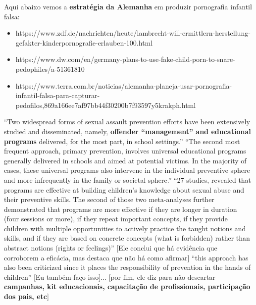 Aqui abaixo vemos a \textbf{estratégia da Alemanha} em produzir pornografia infantil falsa:
\begin{itemize}
  \item https://www.zdf.de/nachrichten/heute/lambrecht-will-ermittlern-herstellung-gefakter-kinderpornografie-erlauben-100.html

  \item https://www.dw.com/en/germany-plans-to-use-fake-child-porn-to-snare-pedophiles/a-51361810

  \item https://www.terra.com.br/noticias/alemanha-planeja-usar-pornografia-infantil-falsa-para-capturar-pedofilos,869a166ee7af97bb44f30200b7f93597y5krakph.html
\end{itemize}

``Two widespread forms of sexual assault prevention efforts have been extensively studied and disseminated, namely, \textbf{offender “management” and educational programs} delivered, for the most part, in school settings.''
``The second most frequent approach, primary prevention, involves universal educational programs generally delivered in schools and aimed at potential victims. In the majority of cases, these universal programs also intervene in the individual preventive sphere and more infrequently in the family or societal sphere.''
``27 studies, revealed that programs are effective at building children’s  knowledge about sexual abuse and their preventive skills. The second of those two meta-analyses further demonstrated that programs are more effective if they are longer in duration (four sessions or more), if they repeat important concepts, if they provide children with multiple opportunities to actively practice the taught notions and skills, and if they are based on concrete concepts (what is forbidden) rather than abstract notions (rights or feelings)'' [Ele conclui que há evidência que corroborem a eficácia, mas destaca que não há como afirmar] ``this approach has also been criticized since it places the responsibility of prevention in the hands of children'' [Eu também faço isso]... [por fim, ele diz para não descartar \textbf{campanhas, kit educacionais, capacitação de profissionais, participação dos pais, etc}] \cite{collin2013lessons}



